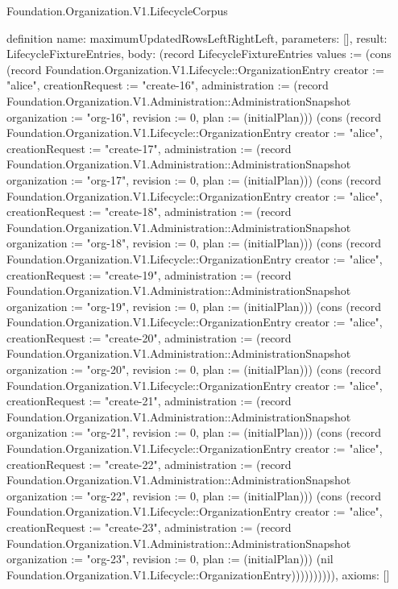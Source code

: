 \begin{lexlean}{Foundation.Organization.V1.LifecycleCorpus}
\begin{semanticmodule}
definition{
  name: maximumUpdatedRowsLeftRightLeft,
  parameters: [],
  result: LifecycleFixtureEntries,
  body: (record LifecycleFixtureEntries {values := (cons (record Foundation.Organization.V1.Lifecycle::OrganizationEntry {creator := "alice", creationRequest := "create-16", administration := (record Foundation.Organization.V1.Administration::AdministrationSnapshot {organization := "org-16", revision := 0, plan := (initialPlan)})}) (cons (record Foundation.Organization.V1.Lifecycle::OrganizationEntry {creator := "alice", creationRequest := "create-17", administration := (record Foundation.Organization.V1.Administration::AdministrationSnapshot {organization := "org-17", revision := 0, plan := (initialPlan)})}) (cons (record Foundation.Organization.V1.Lifecycle::OrganizationEntry {creator := "alice", creationRequest := "create-18", administration := (record Foundation.Organization.V1.Administration::AdministrationSnapshot {organization := "org-18", revision := 0, plan := (initialPlan)})}) (cons (record Foundation.Organization.V1.Lifecycle::OrganizationEntry {creator := "alice", creationRequest := "create-19", administration := (record Foundation.Organization.V1.Administration::AdministrationSnapshot {organization := "org-19", revision := 0, plan := (initialPlan)})}) (cons (record Foundation.Organization.V1.Lifecycle::OrganizationEntry {creator := "alice", creationRequest := "create-20", administration := (record Foundation.Organization.V1.Administration::AdministrationSnapshot {organization := "org-20", revision := 0, plan := (initialPlan)})}) (cons (record Foundation.Organization.V1.Lifecycle::OrganizationEntry {creator := "alice", creationRequest := "create-21", administration := (record Foundation.Organization.V1.Administration::AdministrationSnapshot {organization := "org-21", revision := 0, plan := (initialPlan)})}) (cons (record Foundation.Organization.V1.Lifecycle::OrganizationEntry {creator := "alice", creationRequest := "create-22", administration := (record Foundation.Organization.V1.Administration::AdministrationSnapshot {organization := "org-22", revision := 0, plan := (initialPlan)})}) (cons (record Foundation.Organization.V1.Lifecycle::OrganizationEntry {creator := "alice", creationRequest := "create-23", administration := (record Foundation.Organization.V1.Administration::AdministrationSnapshot {organization := "org-23", revision := 0, plan := (initialPlan)})}) (nil Foundation.Organization.V1.Lifecycle::OrganizationEntry)))))))))}),
  axioms: []
}


\end{semanticmodule}
\end{lexlean}

